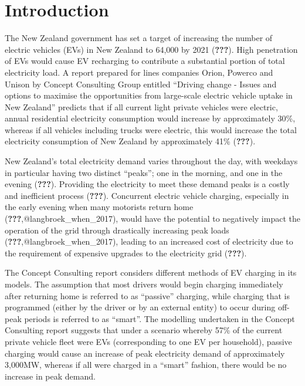 \documentclass[]{article}
\title{}
\author{}
\date{}
\begin{document}
{
\setcounter{tocdepth}{2}
\tableofcontents
}
\hypertarget{introduction}{%
\section{Introduction}\label{introduction}}

The New Zealand government has set a target of increasing the number of electric vehicles (EVs) in New Zealand to 64,000 by 2021 ({\textbf{???}}). High penetration of EVs would cause EV recharging to contribute a substantial portion of total electricity load. A report prepared for lines companies Orion, Powerco and Unison by Concept Consulting Group entitled ``Driving change - Issues and options to maximise the opportunities from large-scale electric vehicle uptake in New Zealand'' predicts that if all current light private vehicles were electric, annual residential electricity consumption would increase by approximately 30\%, whereas if all vehicles including trucks were electric, this would increase the total electricity consumption of New Zealand by approximately 41\% ({\textbf{???}}).

New Zealand's total electricity demand varies throughout the day, with weekdays in particular having two distinct ``peaks''; one in the morning, and one in the evening ({\textbf{???}}). Providing the electricity to meet these demand peaks is a costly and inefficient process ({\textbf{???}}). Concurrent electric vehicle charging, especially in the early evening when many motorists return home ({\textbf{???}},@langbroek\_when\_2017), would have the potential to negatively impact the operation of the grid through drastically increasing peak loads ({\textbf{???}},@langbroek\_when\_2017), leading to an increased cost of electricity due to the requirement of expensive upgrades to the electricity grid ({\textbf{???}}).

The Concept Consulting report considers different methods of EV charging in its models. The assumption that most drivers would begin charging immediately after returning home is referred to as ``passive'' charging, while charging that is programmed (either by the driver or by an external entity) to occur during off-peak periods is referred to as ``smart''. The modelling undertaken in the Concept Consulting report suggests that under a scenario whereby 57\% of the current private vehicle fleet were EVs (corresponding to one EV per household), passive charging would cause an increase of peak electricity demand of approximately 3,000MW, whereas if all were charged in a ``smart'' fashion, there would be no increase in peak demand.
\end{document}
